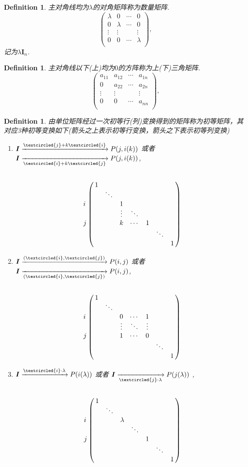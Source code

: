 \documentclass{article}
\newtheorem{definition}[theorem]{Definition}
\newcommand{\mbf}[1]{\bm{#1}}
\begin{document}
\begin{definition}
\rm 主对角线均为$\lambda$的对角矩阵称为数量矩阵.
$$
\begin{pmatrix}
\lambda & 0 & \cdots & 0 \\
0 & \lambda & \cdots & 0 \\
\vdots & \vdots & & \vdots \\
0 & 0 &\cdots & \lambda \\
\end{pmatrix},
$$
记为$\lambda \mbf{I}_{n}$.
\end{definition}

\begin{definition}
\rm  主对角线以下(上)均为$0$的方阵称为上(下)三角矩阵. 
$$
\begin{pmatrix}
a_{11} & a_{12} & \cdots & a_{1n} \\
0 & a_{22} & \cdots & a_{2n} \\
\vdots & \vdots & & \vdots \\
0 & 0 &\cdots & a_{nn} \\
\end{pmatrix},
$$
\end{definition}

\begin{definition}
\rm 由单位矩阵经过一次初等行(列)变换得到的矩阵称为初等矩阵，其对应3种初等变换如下(箭头之上表示初等行变换，箭头之下表示初等列变换)
\begin{enumerate}
	\item $\mbf{I}\xrightarrow{\tiny\textcircled{j} + k\tiny\textcircled{i}} P(j,i(k))$ 或者  $\mbf{I}\xrightarrow[\tiny\textcircled{i} + k\tiny\textcircled{j}]{} P(j,i(k))$,
	$$
		\bordermatrix{
		&\cr
		& 1 \cr
		& &\ddots	\cr
		i& & & 1 \cr
		& & & \vdots & \ddots	\cr
		j& & &  k& \cdots & 1	\cr
		& & & & & & \ddots	\cr
		& & & & & & & 1	\cr
		}
	$$
	\item $\mbf{I}\xrightarrow{(\tiny\textcircled{i},\tiny\textcircled{j})} P(i,j)$ 或者 $\mbf{I}\xrightarrow[(\tiny\textcircled{i},\tiny\textcircled{j})]{} P(i,j)$,
	$$
	\bordermatrix{
		&\cr
		& 1 \cr
		& &\ddots	\cr
		i& & & 0 & \cdots & 1\cr
		& & & \vdots & \ddots & \vdots	\cr
		j& & &  1& \cdots & 0	\cr
		& & & & & & \ddots	\cr
		& & & & & & & 1	\cr
		}
	$$
	\item $\mbf{I}\xrightarrow{\tiny\textcircled{i}\cdot \lambda} P(i(\lambda))$ 或者 $\mbf{I}\xrightarrow[\tiny\textcircled{j}\cdot \lambda]{}P(j(\lambda))$ ,
	$$
	\bordermatrix{
		&\cr
		& 1 \cr
		& &\ddots	\cr
		i& & & \lambda \cr
		& & &  & \ddots	\cr
		j& & &  &  & 1	\cr
		& & & & & & \ddots	\cr
		& & & & & & & 1	\cr
		}
	$$
\end{enumerate}
\end{definition}
\end{document}
